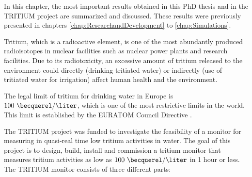 In this chapter, the most important results obtained in this PhD thesis and in the TRITIUM project are summarized and discussed. These results were previously presented in chapters \ref{chap:ResearchandDevelopment} to \ref{chap:Simulations}.

Tritium, which is a radioactive element, is one of the most abundantly produced radioisotopes in nuclear facilities such as nuclear power plants and research facilities. Due to its radiotoxicity, an excessive amount of tritium released to the environment could directly (drinking tritiated water) or indirectly (use of tritiated water for irrigation) affect human health and the environment.

The legal limit of tritium for drinking water in Europe is $100~\becquerel/\liter$, which is one of the most restrictive limits in the world. This limit is established by the EURATOM Council Directive \cite{EURATOM_GL}. %

The TRITIUM project was funded to investigate the feasibility of a monitor 
for measuring in quasi-real time low tritium activities in water. The goal of this project is to design, build, install and commission a tritium monitor that measures tritium activities as low as $100~\becquerel/\liter$ in 1 hour or less. The TRITIUM monitor consists of three different parts:

